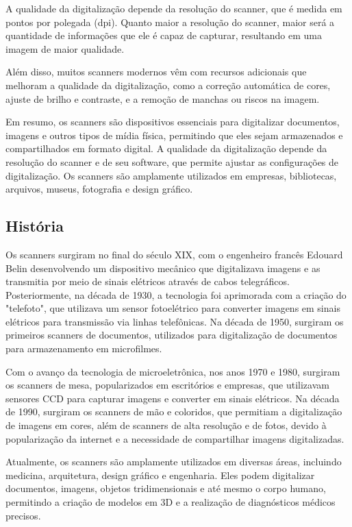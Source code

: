 \documentclass[12pt,a4, oneside, brazil]{article}
\begin{document}
	A qualidade da digitalização depende da resolução do scanner, que é medida em pontos por polegada (dpi). Quanto maior a resolução do scanner, maior será a quantidade de informações que ele é capaz de capturar, resultando em uma imagem de maior qualidade.
	
	Além disso, muitos scanners modernos vêm com recursos adicionais que melhoram a qualidade da digitalização, como a correção automática de cores, ajuste de brilho e contraste, e a remoção de manchas ou riscos na imagem.
	
	Em resumo, os scanners são dispositivos essenciais para digitalizar documentos, imagens e outros tipos de mídia física, permitindo que eles sejam armazenados e compartilhados em formato digital. A qualidade da digitalização depende da resolução do scanner e de seu software, que permite ajustar as configurações de digitalização. Os scanners são amplamente utilizados em empresas, bibliotecas, arquivos, museus, fotografia e design gráfico.
	
	\subsection{História}
	Os scanners surgiram no final do século XIX, com o engenheiro francês Edouard Belin desenvolvendo um dispositivo mecânico que digitalizava imagens e as transmitia por meio de sinais elétricos através de cabos telegráficos. Posteriormente, na década de 1930, a tecnologia foi aprimorada com a criação do "telefoto", que utilizava um sensor fotoelétrico para converter imagens em sinais elétricos para transmissão via linhas telefônicas. Na década de 1950, surgiram os primeiros scanners de documentos, utilizados para digitalização de documentos para armazenamento em microfilmes.
	
	Com o avanço da tecnologia de microeletrônica, nos anos 1970 e 1980, surgiram os scanners de mesa, popularizados em escritórios e empresas, que utilizavam sensores CCD para capturar imagens e converter em sinais elétricos. Na década de 1990, surgiram os scanners de mão e coloridos, que permitiam a digitalização de imagens em cores, além de scanners de alta resolução e de fotos, devido à popularização da internet e a necessidade de compartilhar imagens digitalizadas.
	
	Atualmente, os scanners são amplamente utilizados em diversas áreas, incluindo medicina, arquitetura, design gráfico e engenharia. Eles podem digitalizar documentos, imagens, objetos tridimensionais e até mesmo o corpo humano, permitindo a criação de modelos em 3D e a realização de diagnósticos médicos precisos.
	
\newpage


	
\end{document}
